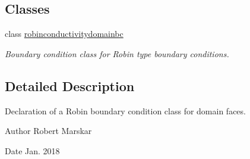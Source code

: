 \subsection*{Classes}
\begin{DoxyCompactItemize}
\item 
class \hyperlink{classrobinconductivitydomainbc}{robinconductivitydomainbc}
\begin{DoxyCompactList}\small\item\em Boundary condition class for Robin type boundary conditions. \end{DoxyCompactList}\end{DoxyCompactItemize}


\subsection{Detailed Description}
Declaration of a Robin boundary condition class for domain faces. 

\begin{DoxyAuthor}{Author}
Robert Marskar 
\end{DoxyAuthor}
\begin{DoxyDate}{Date}
Jan. 2018 
\end{DoxyDate}
